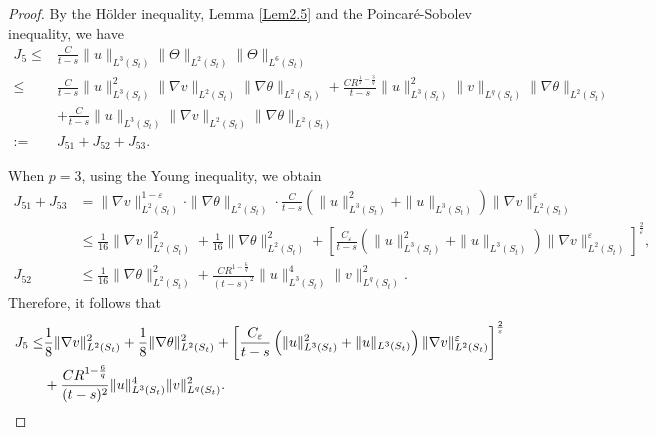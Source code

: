 \documentclass[11pt,reqno]{amsart}
\numberwithin{Thm}{section}
\begin{document}
\begin{proof}
By the H\"older inequality, Lemma \ref{Lem2.5} and the Poincar\'{e}-Sobolev inequality, we have
\begin{align*}
J_5\leq&\frac{C}{t-s}\|u\|_{L^3(S_t)}\|\Theta\|_{L^2(S_t)}\|\Theta\|_{L^6(S_t)}\\
\leq&\frac{C}{t-s}\|u\|_{L^3(S_t)}^2\|\nabla v\|_{L^2(S_t)}\|\nabla\theta\|_{L^2(S_t)}+\frac{CR^{\frac{1}{2}-\frac{3}{q}}}{t-s}\|u\|_{L^3(S_t)}^2\|v\|_{L^q(S_t)}\|\nabla\theta\|_{L^2(S_t)}\\
&+\frac{C}{t-s}\|u\|_{L^3(S_t)}\|\nabla v\|_{L^2(S_t)}\|\nabla\theta\|_{L^2(S_t)} \\
:=&J_{51}+J_{52}+J_{53}.
\end{align*}

When $p=3$, using the Young inequality, we obtain
\begin{align*}
J_{51}+J_{53}&=\|\nabla v\|_{L^2(S_t)}^{1-\varepsilon}\cdot\|\nabla\theta\|_{L^2(S_t)}\cdot\frac{C}{t-s}\left(\|u\|_{L^3(S_t)}^2+\|u\|_{L^3(S_t)}\right)\|\nabla v\|_{L^2(S_t)}^\varepsilon\\
&\leq\frac{1}{16}\|\nabla v\|_{L^2(S_t)}^2+\frac{1}{16}\|\nabla\theta\|_{L^2(S_t)}^2+\left[\frac{C_\varepsilon}{t-s}\left(\|u\|_{L^3(S_t)}^2+\|u\|_{L^3(S_t)}\right)\|\nabla v\|_{L^2(S_t)}^\varepsilon\right]^\frac{2}{\varepsilon},\\
J_{52}&\leq\frac{1}{16}\|\nabla\theta\|_{L^2(S_t)}^2 +\frac{CR^{1-\frac{6}{q}}}{(t-s)^2}\|u\|_{L^3(S_t)}^4\|v\|_{L^q(S_t)}^2.
\end{align*}
Therefore, it follows that
\begin{align}
J_5\leq&\frac{1}{8}\|\nabla v\|_{L^2(S_t)}^2+\frac{1}{8}\|\nabla\theta\|_{L^2(S_t)}^2+\left[\frac{C_\varepsilon}{t-s}\left(\|u\|_{L^3(S_t)}^2+\|u\|_{L^3(S_t)}\right)\|\nabla v\|_{L^2(S_t)}^\varepsilon\right]^\frac{2}{\varepsilon}\notag\\
&+\frac{CR^{1-\frac{6}{q}}}{(t-s)^2}\|u\|_{L^3(S_t)}^4\|v\|_{L^q(S_t)}^2.\label{ine3.24}
\end{align}


\end{proof}
\end{document}
